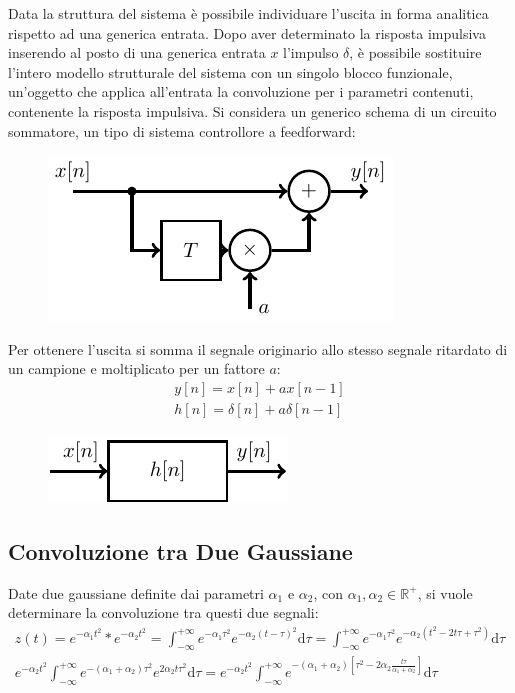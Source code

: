 \documentclass{article}
\newcommand{\df}{\mathrm{d}}
\numberwithin{equation}{subsection}
\begin{document}
Data la struttura del sistema è possibile individuare l'uscita in forma analitica rispetto ad una generica entrata. Dopo aver determinato la risposta impulsiva inserendo 
al posto di una generica entrata $x$ l'impulso $\delta$, è possibile sostituire l'intero modello strutturale del sistema con un singolo blocco funzionale, un'oggetto che 
applica all'entrata la convoluzione per i parametri contenuti, contenente la risposta impulsiva.  
Si considera un generico schema di un circuito sommatore, un tipo di sistema controllore a feedforward:
\begin{figure}[H]%
    \centering
    \includegraphics{circuito-1.pdf}%
\end{figure}
Per ottenere l'uscita si somma il segnale originario allo stesso segnale ritardato di un campione e moltiplicato per un fattore $a$:
\begin{gather*}
    y[n]=x[n]+ax[n-1]\\
    h[n]=\delta[n]+a\delta[n-1]
\end{gather*}
\begin{figure}[H]%
    \centering
    \includegraphics{sistema-io-discreto.pdf}%
\end{figure}

\subsection{Convoluzione tra Due Gaussiane}

Date due gaussiane definite dai parametri $\alpha_1$ e $\alpha_2$, con $\alpha_1,\alpha_2\in\mathbb{R}^+$, si vuole determinare la convoluzione tra questi due segnali:
\begin{gather*}
    z(t)=e^{-\alpha_1t^2}*e^{-\alpha_2t^2}=\displaystyle\int_{-\infty}^{+\infty}e^{-\alpha_1\tau^2}e^{-\alpha_2(t-\tau)^2}\df\tau=\int_{-\infty}^{+\infty}e^{-\alpha_1\tau^2}e^{-\alpha_2(t^2-2t\tau+\tau^2)}\df\tau\\
    \displaystyle e^{-\alpha_2 t^2}\int_{-\infty}^{+\infty}e^{-(\alpha_1+\alpha_2)\tau^2}e^{2\alpha_2t\tau^2}\df\tau=e^{-\alpha_2 t^2}\int_{-\infty}^{+\infty}e^{-(\alpha_1+\alpha_2)\left[\tau^2-2\alpha_2\frac{t\tau}{\alpha_1+\alpha_2}\right]}\df\tau
\end{gather*}
\end{document}
